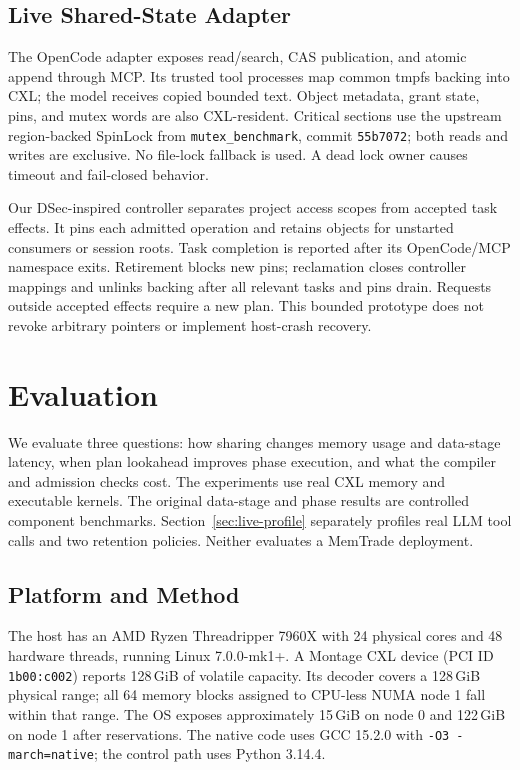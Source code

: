 \documentclass[letterpaper,twocolumn,10pt]{article}
\begin{document}
\subsection{Live Shared-State Adapter}

The OpenCode adapter exposes read/search, CAS publication, and atomic append
through MCP. Its trusted tool processes map common tmpfs backing into CXL;
the model receives copied bounded text. Object metadata, grant state, pins,
and mutex words are also CXL-resident. Critical sections use the upstream
region-backed SpinLock from \texttt{mutex\_benchmark}, commit
\texttt{55b7072}; both reads and writes are exclusive. No file-lock fallback
is used. A dead lock owner causes timeout and fail-closed behavior.

Our DSec-inspired controller separates project access scopes from accepted
task effects. It pins each admitted operation and retains objects for
unstarted consumers or session roots. Task completion is reported after its
OpenCode/MCP namespace exits. Retirement blocks new pins; reclamation closes
controller mappings and unlinks backing after all relevant tasks and pins
drain. Requests outside accepted effects require a new plan. This bounded
prototype does not revoke arbitrary pointers or implement host-crash recovery.

\section{Evaluation}
\label{sec:evaluation}

We evaluate three questions: how sharing changes memory usage and data-stage
latency, when plan lookahead improves phase execution, and what the compiler
and admission checks cost. The experiments use real CXL memory and executable
kernels. The original data-stage and phase results are controlled component
benchmarks. Section~\ref{sec:live-profile} separately profiles real LLM tool
calls and two retention policies. Neither evaluates a MemTrade deployment.

\subsection{Platform and Method}

The host has an AMD Ryzen Threadripper 7960X with 24 physical cores and
48 hardware threads, running Linux 7.0.0-mk1+. A Montage CXL device
(PCI ID \texttt{1b00:c002}) reports 128\,GiB of volatile capacity. Its decoder
covers a 128\,GiB physical range; all 64 memory blocks assigned to CPU-less
NUMA node 1 fall within that range. The OS exposes approximately 15\,GiB on
node 0 and 122\,GiB on node 1 after reservations. The native code uses GCC
15.2.0 with \texttt{-O3 -march=native}; the control path uses Python 3.14.4.
\end{document}
